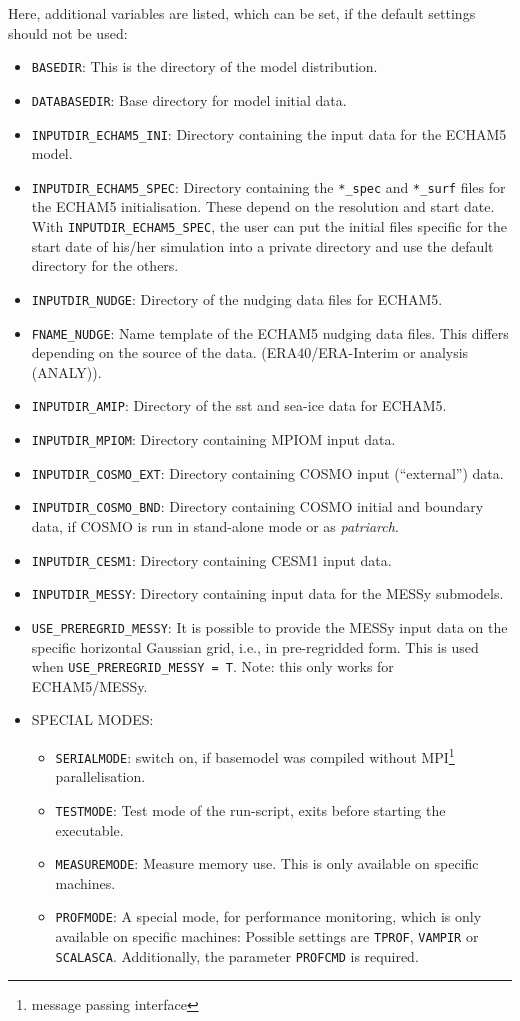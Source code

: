 \documentclass[11pt,twoside]{article}
\begin{document}
Here, additional variables are listed, which can be set, if the default 
settings should not be used:
\begin{itemize}
\item \verb|BASEDIR|: This is the directory of the model distribution.
\item \verb|DATABASEDIR|: Base directory for model initial data.
\item \verb|INPUTDIR_ECHAM5_INI|: Directory containing the input data for the
ECHAM5 model.
\item \verb|INPUTDIR_ECHAM5_SPEC|: Directory containing the \verb|*_spec| and 
\verb|*_surf| files for the ECHAM5 initialisation.
 These depend on the resolution and start date. 
With \verb|INPUTDIR_ECHAM5_SPEC|, the user can put the initial files specific 
for the start date of his/her simulation into a private directory and use the 
default directory for the others.
\item \verb|INPUTDIR_NUDGE|: Directory of the nudging data files for ECHAM5.
\item \verb|FNAME_NUDGE|: Name template of the ECHAM5 nudging data files. 
This differs depending on the source of the data. (ERA40/ERA-Interim or analysis (ANALY)).
\item \verb|INPUTDIR_AMIP|: Directory of the sst and sea-ice data for ECHAM5.
\item \verb|INPUTDIR_MPIOM|: Directory containing MPIOM input data.
\item \verb|INPUTDIR_COSMO_EXT|: Directory containing COSMO input
(``external'') data.
\item \verb|INPUTDIR_COSMO_BND|: Directory containing COSMO initial and
boundary data, if COSMO is run in stand-alone mode or as {\it patriarch}.
\item \verb|INPUTDIR_CESM1|: Directory containing CESM1 input data.
\item \verb|INPUTDIR_MESSY|: Directory containing input data for the MESSy
 submodels.
\item \verb|USE_PREREGRID_MESSY|: It is possible to provide the MESSy input data
 on the specific horizontal Gaussian grid, i.e., in pre-regridded form. This is
used when \verb|USE_PREREGRID_MESSY = T|. Note: this only works for ECHAM5/MESSy.
\item SPECIAL MODES:
\begin{itemize}
\item \verb|SERIALMODE|: switch on, if basemodel was compiled without
MPI\footnote{message passing interface} parallelisation.
\item \verb|TESTMODE|: Test mode of the run-script, exits before starting the
executable.
\item \verb|MEASUREMODE|: Measure memory use. This is only available on 
specific machines. 
\item \verb|PROFMODE|: A special mode, for performance 
monitoring, which is only available on specific machines: Possible
settings are \verb|TPROF|, \verb|VAMPIR| or \verb|SCALASCA|. Additionally, the
parameter \verb|PROFCMD| is required.
\end{itemize}
\end{itemize}
\end{document}
